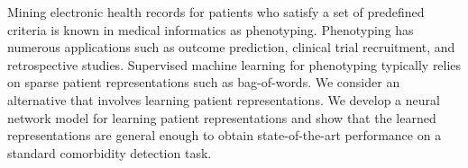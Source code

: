 Mining electronic health records for patients who satisfy a set of predefined criteria is known in medical informatics as phenotyping. Phenotyping has numerous applications such as outcome prediction, clinical trial recruitment, and retrospective studies. Supervised machine learning for phenotyping typically relies on sparse patient representations such as bag-of-words. We consider an alternative that involves learning patient representations. We develop a neural network model for learning patient representations and show that the learned representations are general enough to obtain state-of-the-art performance on a standard comorbidity detection task.
